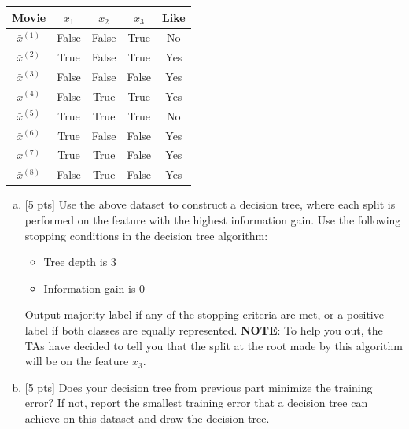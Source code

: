 \documentclass[11pt]{article}
\begin{document}
\begin{enumerate}
\begin{center}
\begin{tabular}{c|c c c |c}
\hline
    Movie &$x_1$&$x_2$ & $x_3$ & Like\\ \hline
    $\bar{x}^{(1)}$ & False & False & True & No\\
    $\bar{x}^{(2)}$ & True & False & True & Yes\\
    $\bar{x}^{(3)}$ & False & False & False & Yes\\
    $\bar{x}^{(4)}$ & False & True & True & Yes\\
    $\bar{x}^{(5)}$ & True & True & True & No\\
    $\bar{x}^{(6)}$ & True & False & False & Yes\\
    $\bar{x}^{(7)}$ & True & True & False & Yes\\
    $\bar{x}^{(8)}$ & False & True & False & Yes\\ \hline
\end{tabular}
\end{center}

\begin{enumerate}[(a)]
    \item {[5 pts]} Use the above dataset to construct a decision tree, where each split is performed on the feature with the highest information gain. Use the following stopping conditions in the decision tree algorithm:
\begin{itemize}
    \item Tree depth is 3
    \item Information gain is 0
\end{itemize}
Output majority label if any of the stopping criteria are met, or a positive label if both classes are equally represented. \textbf{NOTE}: To help you out, the TAs have decided to tell you that the split at the root made by this algorithm will be on the feature $x_3$.

\begin{tcolorbox}[fit,height=7cm, width=15cm, blank, borderline={1pt}{-2pt},nobeforeafter]

\end{tcolorbox}

\item {[5 pts]} Does your decision tree from previous part minimize the training error? If not, report the smallest training error that a decision tree can achieve on this dataset and draw the decision tree. \\


\begin{tcolorbox}[fit,height=8cm, width=15cm, blank, borderline={1pt}{-2pt},nobeforeafter]


\end{tcolorbox}
\end{enumerate}
\end{enumerate}
\end{document}
